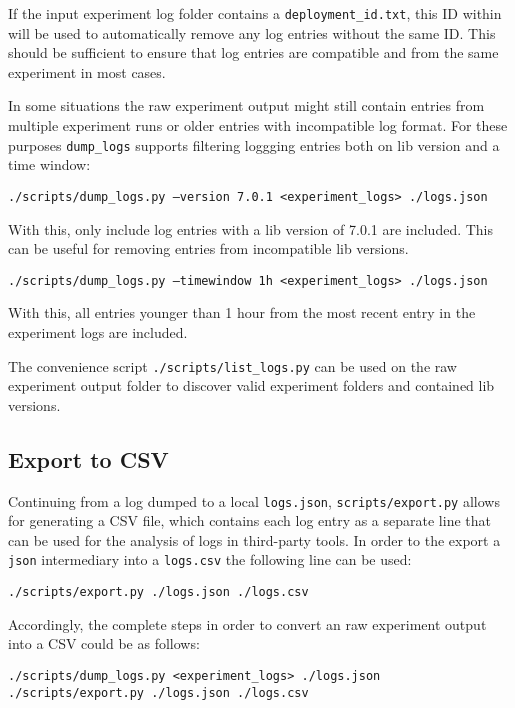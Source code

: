 \documentclass[../main.tex]{subfiles}
\begin{document}
If the input experiment log folder contains a \texttt{deployment\_id.txt}, 
this ID within will be used to automatically remove any log entries without the same ID. 
This should be sufficient to ensure that log entries are compatible and from the same experiment in most cases.

In some situations the raw experiment output might still contain entries from multiple experiment runs or
older entries with incompatible log format. 
For these purposes \texttt{dump\_logs} supports filtering loggging entries both on lib version and a time window:

\begin{tcolorbox}
  \texttt{./scripts/dump_logs.py --version 7.0.1 <experiment_logs> ./logs.json}
\end{tcolorbox}\noindent
With this, only include log entries with a lib version of 7.0.1 are included. 
This can be useful for removing entries from incompatible lib versions.
\begin{tcolorbox}
  \texttt{./scripts/dump_logs.py --timewindow 1h <experiment_logs> ./logs.json}
\end{tcolorbox}\noindent
With this, all entries younger than 1 hour from the most recent entry in the experiment logs are included.

The convenience script \texttt{./scripts/list\_logs.py} can be used on the raw experiment output folder 
to discover valid experiment folders and contained lib versions.

\subsection{Export to CSV}%
\label{sub:analysisUsageCSVExport}

Continuing from a log dumped to a local \texttt{logs.json}, \texttt{scripts/export.py} allows for generating a CSV file, 
which contains each log entry as a separate line that can be used for the analysis of logs in third-party tools.
In order to the export a \texttt{json} intermediary into a \texttt{logs.csv} the following line can be used:
\begin{tcolorbox}
  \texttt{./scripts/export.py ./logs.json ./logs.csv}
\end{tcolorbox}\noindent

Accordingly, the complete steps in order to convert an raw experiment output into a CSV could be as follows:
\begin{tcolorbox}
\begin{verbatim}
./scripts/dump_logs.py <experiment_logs> ./logs.json
./scripts/export.py ./logs.json ./logs.csv
\end{verbatim}
\end{tcolorbox}
\end{document}
